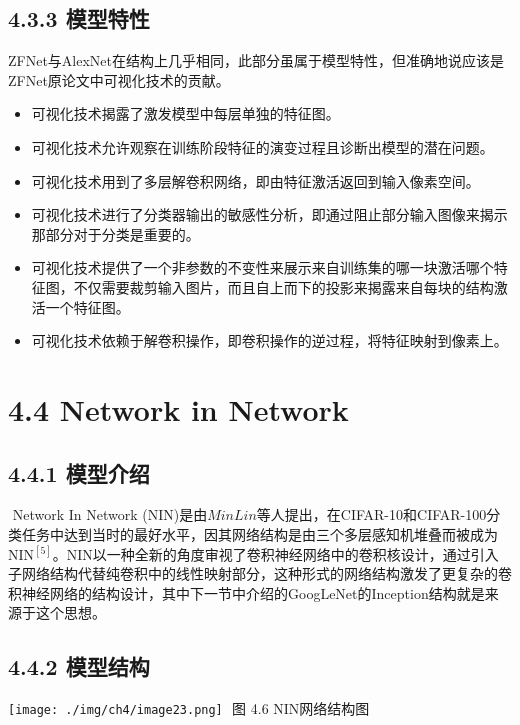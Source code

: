 \subsection{4.3.3 模型特性}\label{ux6a21ux578bux7279ux6027-2}

​
ZFNet与AlexNet在结构上几乎相同，此部分虽属于模型特性，但准确地说应该是ZFNet原论文中可视化技术的贡献。

\begin{itemize}
\item
  可视化技术揭露了激发模型中每层单独的特征图。
\item
  可视化技术允许观察在训练阶段特征的演变过程且诊断出模型的潜在问题。
\item
  可视化技术用到了多层解卷积网络，即由特征激活返回到输入像素空间。
\item
  可视化技术进行了分类器输出的敏感性分析，即通过阻止部分输入图像来揭示那部分对于分类是重要的。
\item
  可视化技术提供了一个非参数的不变性来展示来自训练集的哪一块激活哪个特征图，不仅需要裁剪输入图片，而且自上而下的投影来揭露来自每块的结构激活一个特征图。
\item
  可视化技术依赖于解卷积操作，即卷积操作的逆过程，将特征映射到像素上。
\end{itemize}

\section{4.4 Network in Network}\label{network-in-network}

\subsection{4.4.1 模型介绍}\label{ux6a21ux578bux4ecbux7ecd-3}

​ Network In Network
(NIN)是由\(Min Lin\)等人提出，在CIFAR-10和CIFAR-100分类任务中达到当时的最好水平，因其网络结构是由三个多层感知机堆叠而被成为NIN\(^{[5]}\)。NIN以一种全新的角度审视了卷积神经网络中的卷积核设计，通过引入子网络结构代替纯卷积中的线性映射部分，这种形式的网络结构激发了更复杂的卷积神经网络的结构设计，其中下一节中介绍的GoogLeNet的Inception结构就是来源于这个思想。

\subsection{4.4.2 模型结构}\label{ux6a21ux578bux7ed3ux6784-3}

\texttt{[image: ./img/ch4/image23.png]} ​ 图 4.6 NIN网络结构图

